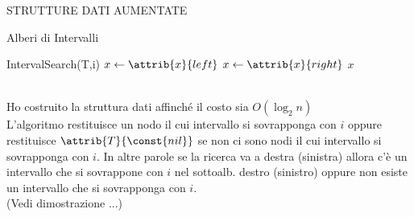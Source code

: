 \documentclass[8pt]{extarticle}
\begin{document}
\begin{formulario}
\begin{myParagraph}{STRUTTURE DATI AUMENTATE}
\begin{subParagraph}{Alberi di Intervalli}
\begin{Descr}
\begin{code}{IntervalSearch(T,i)}
		\li $x \get \attrib{x}{left}$
	\li \ELSE
		\li $x \get \attrib{x}{right}$
	\END
\END
\li \RETURN $x$
				\end{code}
\\
Ho costruito la struttura dati affinché il costo sia $O(\log_2 n)$
\\
L'algoritmo restituisce un nodo il cui intervallo si sovrapponga con $i$ oppure restituisce $\attrib{T}{\const{nil}}$ se non ci sono nodi il cui intervallo si sovrapponga con $i$. In altre parole se la ricerca va a destra (sinistra) allora c'è un intervallo che si sovrappone con $i$ nel sottoalb. destro (sinistro) oppure non esiste un intervallo che si sovrapponga con $i$.\\
(Vedi dimostrazione ...)
			\end{Descr}
		\end{subParagraph}
	\end{myParagraph}
	

\end{formulario}
\end{document}
